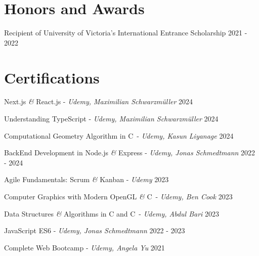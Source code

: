 \documentclass[a4paper,10pt]{article}
\begin{document}
\section{Honors and Awards}
\honorsawards
{Recipient of University of Victoria’s International Entrance Scholarship}
{2021 - 2022}

\section{Certifications}

\honorsawards
{Next.js \textit{\&} React.js - \textit{Udemy, Maximilian Schwarzmüller}}
{2024}

\honorsawards
{Understanding TypeScript - \textit{Udemy, Maximilian Schwarzmüller}}
{2024}

\honorsawards
{Computational Geometry Algorithm in C\plusplus\ - \textit{Udemy, Kasun Liyanage}}
{2024}

\honorsawards
{BackEnd Development in Node.js \textit{\&} Express - \textit{Udemy, Jonas Schmedtmann}}
{2022 - 2024}

\honorsawards
{Agile Fundamentals: Scrum \textit{\&} Kanban - \textit{Udemy}}
{2023}

\honorsawards
{Computer Graphics with Modern OpenGL \textit{\&} C\plusplus\ - \textit{Udemy, Ben Cook}}
{2023}

\honorsawards
{Data Structures \textit{\&} Algorithms in C and C\plusplus\ - \textit{Udemy, Abdul Bari}}
{2023}

\honorsawards
{JavaScript ES6 - \textit{Udemy, Jonas Schmedtmann}}
{2022 - 2023}

\honorsawards
{Complete Web Bootcamp - \textit{Udemy, Angela Yu}}
{2021}
\end{document}
